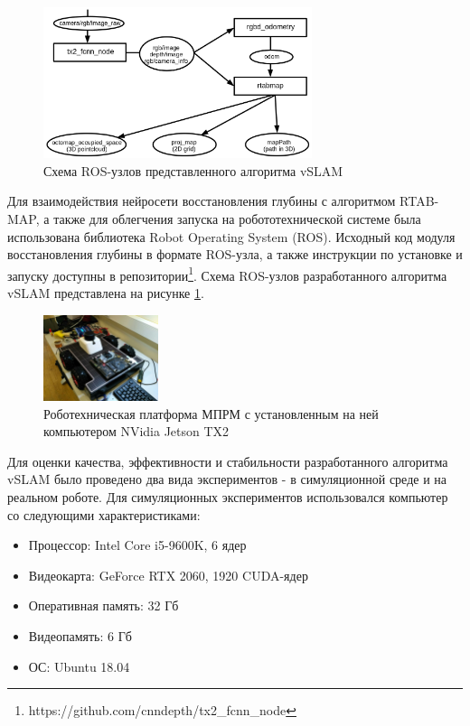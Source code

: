 \documentclass{mipt-thesis-ms}
\begin{document}
	\begin{figure}
		\centering
		\includegraphics[width=0.7\textwidth]{img/rosnode_scheme.png}
		\caption{Схема ROS-узлов представленного алгоритма vSLAM}
		\label{figure_rosnode}
	\end{figure}
	
	Для взаимодействия нейросети восстановления глубины с алгоритмом RTAB-MAP, а также для облегчения запуска на робототехнической системе была использована библиотека Robot Operating System (ROS)\cite{koubaa2017robot}. Исходный код модуля восстановления глубины в формате ROS-узла, а также инструкции по установке и запуску доступны в репозитории\footnote{https://github.com/cnndepth/tx2\_fcnn\_node}. Схема ROS-узлов разработанного алгоритма vSLAM представлена на рисунке \ref{figure_rosnode}.
	
	\begin{figure}
		\centering
		\includegraphics[width=0.3\textwidth]{img/mprm.jpg}
		\caption{Роботехническая платформа МПРМ с установленным на ней компьютером NVidia Jetson TX2}
		\label{figure_mprm}
	\end{figure}
	
	Для оценки качества, эффективности и стабильности разработанного алгоритма vSLAM было проведено два вида экспериментов - в симуляционной среде и на реальном роботе. Для симуляционных экспериментов использовался компьютер со следующими характеристиками:
	
	\begin{itemize}
		\item Процессор: Intel Core i5-9600K, 6 ядер
		\item Видеокарта: GeForce RTX 2060, 1920 CUDA-ядер
		\item Оперативная память: 32 Гб
		\item Видеопамять: 6 Гб
		\item ОС: Ubuntu 18.04
 	\end{itemize}
 
\end{document}
